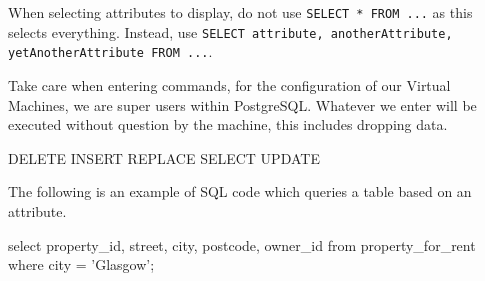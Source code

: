 When selecting attributes to display, do not use \verb|SELECT * FROM ...| as this selects everything. Instead, use \verb|SELECT attribute, anotherAttribute, yetAnotherAttribute FROM ...|. 

Take care when entering commands, for the configuration of our Virtual Machines, we are super users within PostgreSQL. Whatever we enter will be executed without question by the machine, this includes dropping data.
\begin{sql}
DELETE
INSERT
REPLACE
SELECT
UPDATE
\end{sql}
The following is an example of SQL code which queries a table based on an attribute.
\begin{sql}
select property_id,
street,
city,
postcode,
owner_id from property_for_rent
where city = 'Glasgow';
\end{sql}